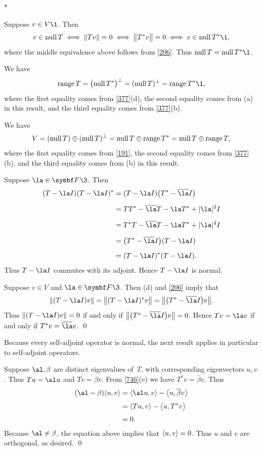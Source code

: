 \proof
\begin{subtheorem}*
\item
Suppose $v \in V\1$. Then
\[
v \in \ker T \iff \norm{Tv} = 0 \iff \norm[\big]{T^*v} = 0 \iff v \in \ker T^*\1,
\]
where the middle equivalence above follows from \ref{206}. Thus
$\ker T = \ker T^*\1$.

\item
We have
\[
\ran T = \paren[\big]{\ker T^*}^\perp = (\ker T)^\perp = \ran T^*\1,
\]
where the first equality comes from \ref{377}(d), the second equality comes from
(a) in this result, and the third equality comes from \ref{377}(b).

\item
We have
\[
V = (\operatorname{null} T) \oplus (\operatorname{null} T)^\perp = \operatorname{null} T \oplus \operatorname{range} T^* = \operatorname{null} T \oplus \operatorname{range} T,
\]
where the first equality comes from \ref{191}, the second equality comes from \ref{377}(b), and the third equality comes from (b) in this result.

\item
Suppose $\la \in \F{}\3$. Then
\begin{align*}
(T - \la I)(T-\la I)^* &= (T - \la I)\paren[\big]{T^* - \bar{\la}I} \\[6bp]
&= TT^* - \bar{\la}T - \la T^* + \abs{\la}^2 I \\[6bp]
&= T^*T - \bar{\la}T - \la T^* + \abs{\la}^2 I \\[6bp]
&= \paren[\big]{T^* - \bar{\la}I}(T - \la I)\\[6bp]
&= (T - \la I)^* (T-\la I).
\end{align*}
Thus $T - \la I$ commutes with its adjoint. Hence $T - \la I$ is normal.

\item
Suppose $v \in V$ and $\la \in \F{}\3$. Then (d) and \ref{206} imply that
\[
\| (T - \la I) v \| = \norm[\big]{ (T - \la I)^* v } = \norm[\big]{ \paren[\big]{T^* - \bar{\la}I} v }.
\]
Thus $\| (T - \la I) v \| = 0$ if and only if  $\norm[\big]{ \paren[\big]{T^* - \bar{\la}I} v } = 0$. Hence $Tv = \la v$ if and only if $T^*v = \bar{\la} v$.
\qed
\end{subtheorem}

Because every self-adjoint operator is normal, the next result applies
in particular to self-adjoint operators.


\proof
Suppose  $\al, \beta$ are distinct eigenvalues
of~$T$, with corresponding eigenvectors $u, v$.  Thus $Tu = \al u$ and
$Tv = \beta v$.  From \ref{746}(e) we have $T^*v = \bar{\beta}v$.  Thus
\begin{align*}
(\al - \beta)\ip{u,v} &= \ip{\al u, v} - \ip[\big]{u, \bar{\beta} v} \\[3bp]
&= \ip{Tu, v} - \ip[\big]{u, T^*v} \\[3bp]
&= 0.
\end{align*}
Because $\al \ne \beta$, the equation above implies that $\langle u,v\rangle = 0$.  Thus
$u$ and $v$ are orthogonal, as desired.
\qed

